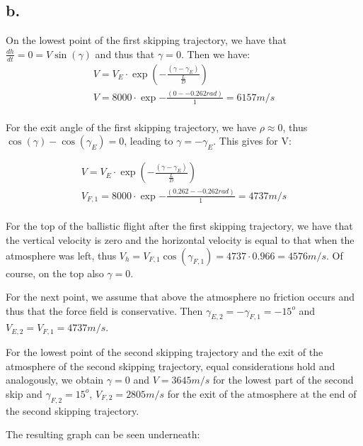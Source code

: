 \subsection*{b.}

On the lowest point of the first skipping trajectory, we have that $\frac{d h}{dt} = 0 = V \sin{(\gamma)}$ and thus that $\gamma = 0$. Then we have:
\begin{equation}
\begin{split}
    V = V_E \cdot \exp{(- \frac{(\gamma - \gamma_E)}{\frac{L}{D}})}\\
    V = 8000 \cdot \exp{-\frac{(0 - -0.262 rad)}{1}} = 6157 m/s\\
    \end{split}
\end{equation}

For the exit angle of the first skipping trajectory, we have $\rho \approx 0$, thus $\cos{(\gamma) - \cos{(\gamma_E)}} = 0$, leading to $\gamma = -\gamma_E$. This gives for V:

\begin{equation}
    \begin{split}
    V = V_E \cdot \exp{(- \frac{(\gamma - \gamma_E)}{\frac{L}{D}})}\\
    V_{F,1} = 8000 \cdot \exp{-\frac{(0.262 - -0.262 rad)}{1}} = 4737 m/s\\
    \end{split}
\end{equation}

For the top of the ballistic flight after the first skipping trajectory, we have that the vertical velocity is zero and the horizontal velocity is equal to that when the atmosphere was left, thus $V_h = V_{F,1} \cos{(\gamma_{F,1})} = 4737 \cdot 0.966 = 4576 m/s$. Of course, on the top also $\gamma = 0$.

For the next point, we assume that above the atmosphere no friction occurs and thus that the force field is conservative. Then $\gamma_{E,2} = - \gamma_{F,1} = - 15^o$ and $V_{E,2} = V_{F,1} = 4737 m/s$.

For the lowest point of the second skipping trajectory and the exit of the atmosphere of the second skipping trajectory, equal considerations hold and analogously, we obtain $\gamma = 0$ and $V = 3645 m/s$ for the lowest part of the second skip and $\gamma_{F,2} = 15^o$, $V_{F,2} = 2805 m/s$ for the exit of the atmosphere at the end of the second skipping trajectory.

The resulting graph can be seen underneath:

